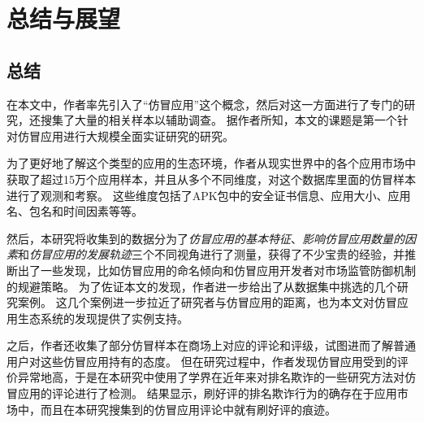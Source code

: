 \chapter{总结与展望}
\label{chp:future}

\section{总结}
在本文中，作者率先引入了``仿冒应用''这个概念，然后对这一方面进行了专门的研究，还搜集了大量的相关样本以辅助调查。
据作者所知，本文的课题是第一个针对仿冒应用进行大规模全面实证研究的研究。

为了更好地了解这个类型的应用的生态环境，作者从现实世界中的各个应用市场中获取了超过15万个应用样本，并且从多个不同维度，对这个数据库里面的仿冒样本进行了观测和考察。
这些维度包括了APK包中的安全证书信息、应用大小、应用名、包名和时间因素等等。

然后，本研究将收集到的数据分为了\emph{仿冒应用的基本特征}、\emph{影响仿冒应用数量的因素}和\emph{仿冒应用的发展轨迹}三个不同视角进行了测量，获得了不少宝贵的经验，并推断出了一些发现，比如仿冒应用的命名倾向和仿冒应用开发者对市场监管防御机制的规避策略。
为了佐证本文的发现，作者进一步给出了从数据集中挑选的几个研究案例。
这几个案例进一步拉近了研究者与仿冒应用的距离，也为本文对仿冒应用生态系统的发现提供了实例支持。

之后，作者还收集了部分仿冒样本在商场上对应的评论和评级，试图进而了解普通用户对这些仿冒应用持有的态度。
但在研究过程中，作者发现仿冒应用受到的评价异常地高，于是在本研究中使用了学界在近年来对排名欺诈的一些研究方法对仿冒应用的评论进行了检测。
结果显示，刷好评的排名欺诈行为的确存在于应用市场中，而且在本研究搜集到的仿冒应用评论中就有刷好评的痕迹。

